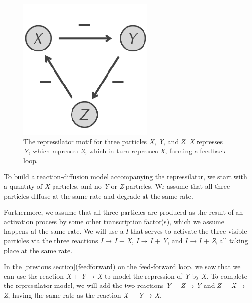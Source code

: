 \begin{figure}[h]
\centering
\mySfFamily
\includegraphics[width = 0.6\textwidth]{../images/repressilator.png}
\caption{The repressilator motif for three particles \textit{X}, \textit{Y}, and \textit{Z}. \textit{X} represses \textit{Y}, which represses \textit{Z}, which in turn represses \textit{X}, forming a feedback loop.}
\label{fig:repressilator}
\end{figure}

\begin{qbox}\end{qbox} 

To build a reaction-diffusion model accompanying the repressilator, we start with a quantity of \textit{X} particles, and no \textit{Y} or \textit{Z} particles. We assume that all three particles diffuse at the same rate and degrade at the same rate.

Furthermore, we assume that all three particles are produced as the result of an activation process by some other transcription factor(s), which we assume happens at the same rate. We will use a  \textit{I} that serves to activate the three visible particles via the three reactions \textit{I} → \textit{I} + \textit{X}, \textit{I} → \textit{I} + \textit{Y}, and \textit{I} → \textit{I} + \textit{Z}, all taking place at the same rate.

In the [previous section](feedforward) on the feed-forward loop, we saw that we can use the reaction \textit{X} + \textit{Y} → \textit{X} to model the repression of \textit{Y} by \textit{X}. To complete the repressilator model, we will add the two reactions \textit{Y} + \textit{Z} → \textit{Y} and \textit{Z} + \textit{X} → \textit{Z}, having the same rate as the reaction \textit{X} + \textit{Y} → \textit{X}.

